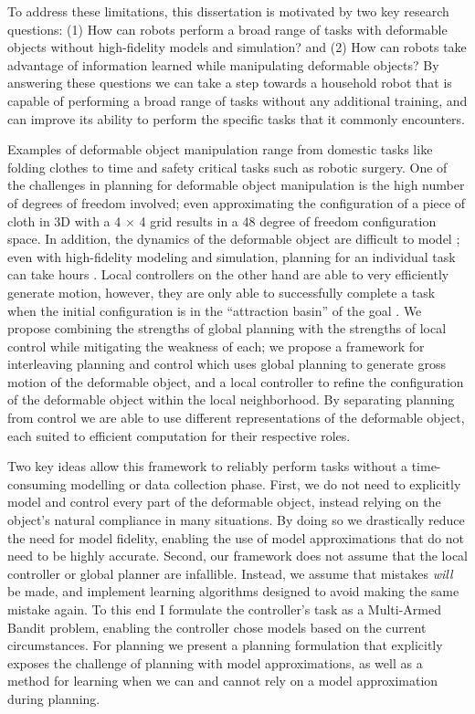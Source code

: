To address these limitations, this dissertation is motivated by two key research questions: (1) How can robots perform a broad range of tasks with deformable objects without high-fidelity models and simulation? and (2) How can robots take advantage of information learned while manipulating deformable objects? By answering these questions we can take a step towards a household robot that is capable of performing a broad range of tasks without any additional training, and can improve its ability to perform the specific tasks that it commonly encounters.

Examples of deformable object manipulation range from domestic tasks like folding clothes to time and safety critical tasks such as robotic surgery. One of the challenges in planning for deformable object manipulation is the high number of degrees of freedom involved; even approximating the configuration of a piece of cloth in 3D with a 4 $\times$ 4 grid results in a 48 degree of freedom configuration space. In addition, the dynamics of the deformable object are difficult to model \cite{Essahbi2012}; even with high-fidelity modeling and simulation, planning for an individual task can take hours \cite{Bai2016}. Local controllers on the other hand are able to very efficiently generate motion, however, they are only able to successfully complete a task when the initial configuration is in the ``attraction basin'' of the goal \cite{Berenson2013, McConachie2018}. We propose combining the strengths of global planning with the strengths of local control while mitigating the weakness of each; we propose a framework for interleaving planning and control which uses global planning to generate gross motion of the deformable object, and a local controller to refine the configuration of the deformable object within the local neighborhood. By separating planning from control we are able to use different representations of the deformable object, each suited to efficient computation for their respective roles.

Two key ideas allow this framework to reliably perform tasks without a time-consuming modelling or data collection phase. First, we do not need to explicitly model and control every part of the deformable object, instead relying on the object's natural compliance in many situations. By doing so we drastically reduce the need for model fidelity, enabling the use of model approximations that do not need to be highly accurate. Second, our framework does not assume that the local controller or global planner are infallible. Instead, we assume that mistakes \textit{will} be made, and implement learning algorithms designed to avoid making the same mistake again. To this end I formulate the controller's task as a Multi-Armed Bandit problem, enabling the controller chose models based on the current circumstances. For planning we present a planning formulation that explicitly exposes the challenge of planning with model approximations, as well as a method for learning when we can and cannot rely on a model approximation during planning.

